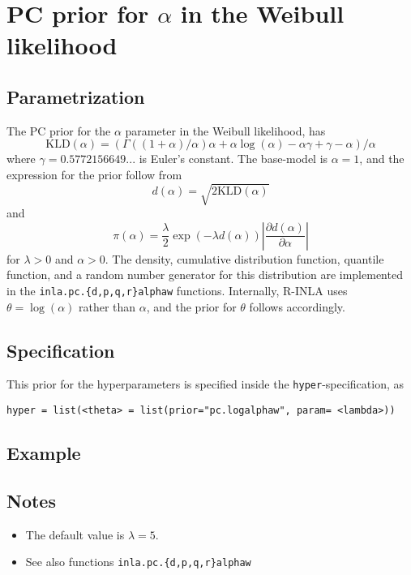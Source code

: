 \documentclass[a4paper,11pt]{article}
\begin{document}
\section*{PC prior for $\alpha$ in the Weibull likelihood}

\subsection*{Parametrization}
The PC prior for the $\alpha$ parameter in the Weibull likelihood, has
\begin{displaymath}
    \text{KLD}(\alpha) = (\Gamma((1 + \alpha)/\alpha)\alpha + \alpha
    \log(\alpha) -
    \alpha\gamma + \gamma - \alpha)/\alpha
\end{displaymath}
where $\gamma = 0.5772156649...$ is Euler's constant. The base-model is
$\alpha=1$, and the expression for the prior follow from
\begin{displaymath}
    d(\alpha) = \sqrt{2\text{KLD}(\alpha)}
\end{displaymath}
and
\begin{displaymath}
    \pi(\alpha) = \frac{\lambda}{2} \exp(-\lambda d(\alpha)) \left|\frac{\partial
    d(\alpha)}{\partial\alpha}\right|
\end{displaymath}
for $\lambda>0$ and $\alpha{} > 0$. The density, cumulative
distribution function, quantile function, and a random number
generator for this distribution are implemented in the
\texttt{inla.pc.\{d,p,q,r\}alphaw} functions. Internally, R-INLA uses
$\theta = \log(\alpha)$ rather than $\alpha$, and the prior for
$\theta$ follows accordingly.

\subsection*{Specification}
This prior for the hyperparameters is specified inside the
\texttt{hyper}-specification, as
\begin{center}
    \texttt{hyper = list(<theta> =
        list(prior="pc.logalphaw", param= <lambda>))}
\end{center}

\subsection*{Example}

\subsection*{Notes}

\begin{itemize}
\item The default value is $\lambda = 5$.
\item See also functions \texttt{inla.pc.\{d,p,q,r\}alphaw}
\end{itemize}
\end{document}
